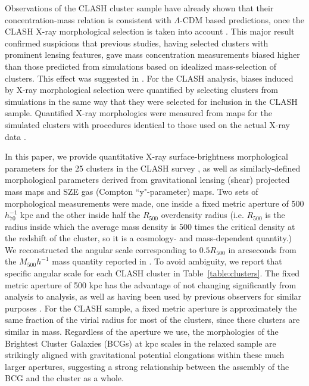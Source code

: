 \documentclass[iop,twocolumn]{emulateapj}
\begin{document}
{Observations of the CLASH cluster sample have already shown that their concentration-mass relation is consistent with $\Lambda$-CDM based predictions, once the CLASH X-ray morphological selection is taken into account  \citep{2015ApJ...806....4M,meneghetti.etal.2014,2014ApJ...795..163U,2015arXiv150704385U}. 
This major result confirmed suspicions that previous studies, having selected clusters with prominent lensing features, gave mass concentration measurements biased higher than those predicted from simulations based on idealized mass-selection of clusters.  This effect was suggested in \citet[e.g., ][]{2007MNRAS.379..190C,2010A&A...519A..90M,2016MNRAS.455..892G}.
For the CLASH analysis, biases induced by X-ray morphological selection were quantified by selecting clusters from  simulations in the same way that they were selected for inclusion in the CLASH sample. Quantified X-ray morphologies were measured from maps for the simulated clusters with procedures identical to those used on the actual X-ray data \citep{meneghetti.etal.2014}.

In this paper, we provide quantitative X-ray  surface-brightness morphological parameters for the 25 clusters in the CLASH survey \citep{2012ApJ...756..159P}, as well as  similarly-defined morphological parameters derived from gravitational lensing (shear) projected mass maps and SZE gas (Compton ``y"-parameter) maps.
Two sets of morphological measurements were made, one inside a fixed metric aperture of 500 $h_{70}^{-1}$ kpc and
the other inside half the $R_{500}$ overdensity radius 
(i.e. $R_{500}$ is the radius inside which the average mass density is 500 times the critical density at the redshift of the cluster, so it is a cosmology- and mass-dependent quantity.)
We reconstructed the angular scale corresponding to $0.5 R_{500}$  in arcseconds from the $M_{500} h^{-1}$ mass quantity reported in \citet{2015ApJ...806....4M}. 
To avoid ambiguity, we report that specific angular scale for each CLASH cluster in Table~\ref{table:clusters}.
The fixed metric aperture of 500 kpc has the advantage of not changing significantly from analysis to analysis, as
well as having been used by previous observers for similar purposes \citep[e.g.,][]{2005ApJ...624..606J,2010ApJ...721L..82C}. 
For the CLASH sample, a fixed metric aperture is approximately the same fraction of the virial radius for most of the clusters, since these clusters are similar in mass.  
Regardless of the aperture we use, the morphologies of the Brightest Cluster Galaxies (BCGs) at kpc scales in the relaxed sample are strikingly aligned with gravitational potential elongations within these much larger apertures, suggesting a strong relationship between the assembly of the BCG and the cluster as a whole.
 
}
\end{document}
